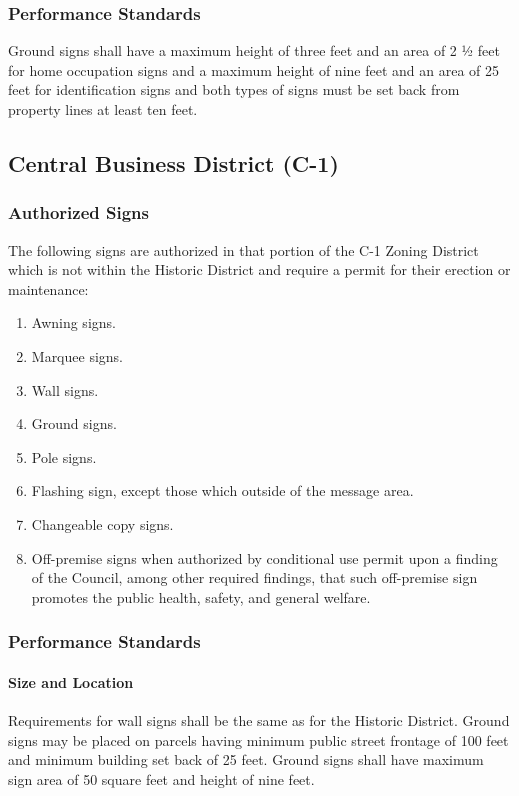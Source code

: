 \subsubsection{Performance Standards}
Ground signs shall have a maximum height of three feet and an area of 2 ½ feet for home occupation signs and a maximum height of nine feet and an area of 25 feet for identification signs and both types of signs must be set back from property lines at least ten feet.
\subsection{Central Business District (C-1)}
\subsubsection{Authorized Signs}
The following signs are authorized in that portion of the C-1 Zoning District which is not within the Historic District and require a permit for their erection or maintenance:
\begin{enumerate}[{\indent}a)]
    \item Awning signs.
    \item Marquee signs.
    \item Wall signs.
    \item Ground signs.
    \item Pole signs.
    \item Flashing sign, except those which outside of the message area.
    \item Changeable copy signs.
    \item Off-premise signs when authorized by conditional use permit upon a finding of the Council, among other required findings, that such off-premise sign promotes the public health, safety, and general welfare.
\end{enumerate}
\subsubsection{Performance Standards}
\paragraph{Size and Location}
Requirements for wall signs shall be the same as for the Historic District.  Ground signs may be placed on parcels having minimum public street frontage of 100 feet and minimum building set back of 25 feet.  Ground signs shall have maximum sign area of 50 square feet and height of nine feet.
